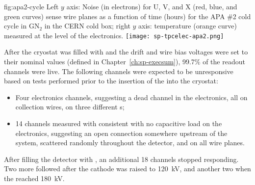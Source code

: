 \begin{dunefigure}
{fig:apa2-cycle}
{Left $y$ axis: Noise (in electrons) for U, V, and X (red, blue, and green 
curves) sense wire planes as a function of time (hours) for the APA \#2 cold 
cycle in GN$_2$ in the CERN cold box; right $y$ axis: temperature 
(orange curve) measured at the level of the  electronics.}
\texttt{[image: sp-tpcelec-apa2.png]}
\end{dunefigure}
After the cryostat was filled with  and the drift and wire 
bias voltages were set to their nominal values (defined in Chapter~\ref{ch:sp-execsum}), 
99.7\% of the  readout channels were live. %
The following 
channels were expected to be unresponsive %
based on tests performed prior to the insertion of the  into
the cryostat:
\begin{itemize}
\item{Four electronics channels, suggesting a dead channel in the electronics, 
all on collection wires, on three different s;}
\item{14 channels measured with consistent with no capacitive load
on the  electronics, suggesting an open connection somewhere upstream %
of the  system, scattered randomly throughout the detector, 
and on all wire planes.}
\end{itemize}

\begin{comment}  No need for itemizing here (anne)
Two additional sets of channels were observed to be non-responsive
after filling the detector with \lar:
\begin{itemize}
\item{An additional 18 channels were found to be non-responsive
immediately after the \lar filling was complete;}
\item{Two more channels became non-responsive after the cathode
high voltage was raised to \SI{120}{kV}, and two more
when the high voltage reached \SI{180}{kV}.}
\end{itemize}
\end{comment}
After filling the detector with \lar{}, an additional 18 channels stopped responding. Two more  followed  after the cathode  was raised to \SI{120}{kV}, and another two when the   reached \SI{180}{kV}.



